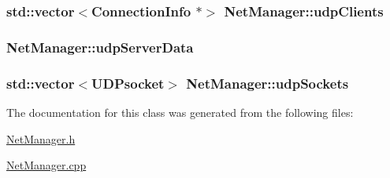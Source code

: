 \hypertarget{classNetManager_ab5cbc9d5ddb14541adb07b748802446d}{
\subsubsection[{udp\-Clients}]{\setlength{\rightskip}{0pt plus 5cm}std\-::vector$<${\bf Connection\-Info} $\ast$$>$ Net\-Manager\-::udp\-Clients\hspace{0.3cm}{\ttfamily [private]}}}\label{classNetManager_ab5cbc9d5ddb14541adb07b748802446d}
\hypertarget{classNetManager_a7db7fafed8aabbe088aa12c731842efd}{
\subsubsection[{udp\-Server\-Data}]{ Net\-Manager\-::udp\-Server\-Data}}\label{classNetManager_a7db7fafed8aabbe088aa12c731842efd}
\hypertarget{classNetManager_aa99d99b6fa90707d9101c4e1a1835018}{
\subsubsection[{udp\-Sockets}]{\setlength{\rightskip}{0pt plus 5cm}std\-::vector$<$U\-D\-Psocket$>$ Net\-Manager\-::udp\-Sockets\hspace{0.3cm}{\ttfamily [private]}}}\label{classNetManager_aa99d99b6fa90707d9101c4e1a1835018}


The documentation for this class was generated from the following files\-:\begin{DoxyCompactItemize}
\item 
\hyperlink{NetManager_8h}{Net\-Manager.\-h}\item 
\hyperlink{NetManager_8cpp}{Net\-Manager.\-cpp}\end{DoxyCompactItemize}
